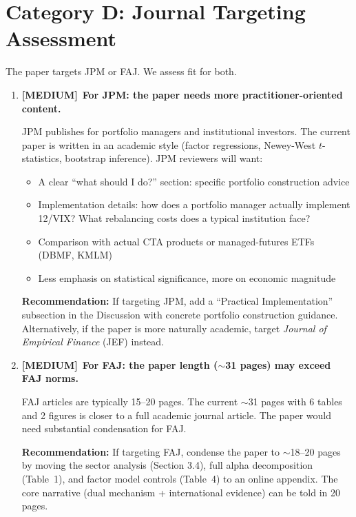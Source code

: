 \documentclass[12pt,a4paper]{article}
\newcommand{\MEDIUM}{\textcolor{medsev}{\textbf{[MEDIUM]}}}
\begin{document}
\section{Category D: Journal Targeting Assessment}

The paper targets JPM or FAJ. We assess fit for both.

\begin{enumerate}[label=\textbf{D.\arabic*}]

\item \MEDIUM\ \textbf{For JPM: the paper needs more practitioner-oriented content.}

JPM publishes for portfolio managers and institutional investors. The current paper is written in an academic style (factor regressions, Newey-West $t$-statistics, bootstrap inference). JPM reviewers will want:

\begin{itemize}
\item A clear ``what should I do?'' section: specific portfolio construction advice
\item Implementation details: how does a portfolio manager actually implement 12/VIX? What rebalancing costs does a typical institution face?
\item Comparison with actual CTA products or managed-futures ETFs (DBMF, KMLM)
\item Less emphasis on statistical significance, more on economic magnitude
\end{itemize}

\textbf{Recommendation:} If targeting JPM, add a ``Practical Implementation'' subsection in the Discussion with concrete portfolio construction guidance. Alternatively, if the paper is more naturally academic, target \textit{Journal of Empirical Finance} (JEF) instead.


\item \MEDIUM\ \textbf{For FAJ: the paper length ($\sim$31 pages) may exceed FAJ norms.}

FAJ articles are typically 15--20 pages. The current $\sim$31 pages with 6 tables and 2 figures is closer to a full academic journal article. The paper would need substantial condensation for FAJ.

\textbf{Recommendation:} If targeting FAJ, condense the paper to $\sim$18--20 pages by moving the sector analysis (Section 3.4), full alpha decomposition (Table~1), and factor model controls (Table~4) to an online appendix. The core narrative (dual mechanism + international evidence) can be told in 20 pages.



\end{enumerate}
\end{document}
